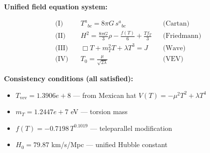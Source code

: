 
\textbf{Unified field equation system:}

\begin{align}
  \text{(I)} \quad & T^a{}_{bc} = 8\pi G \, s^a{}_{bc} && \text{(Cartan)} \\
  \text{(II)} \quad & H^2 = \frac{8\pi G}{3}\rho - \frac{f(T)}{6} + \frac{Tf_T}{3} && \text{(Friedmann)} \\
  \text{(III)} \quad & \Box T + m_T^2 T + \lambda T^3 = J && \text{(Wave)} \\
  \text{(IV)} \quad & T_0 = \frac{\mu}{\sqrt{2\lambda}} && \text{(VEV)}
\end{align}

\textbf{Consistency conditions (all satisfied):}
\begin{itemize}
  \item $T_{\text{vev}} = 1.3906e+8$ — from Mexican hat $V(T) = -\mu^2 T^2 + \lambda T^4$
  \item $m_T = 1.2447e+7$ eV — torsion mass
  \item $f(T) = -0.7198 \, T^{0.1019}$ — teleparallel modification
  \item $H_0 = 79.87$ km/s/Mpc — unified Hubble constant
\end{itemize}